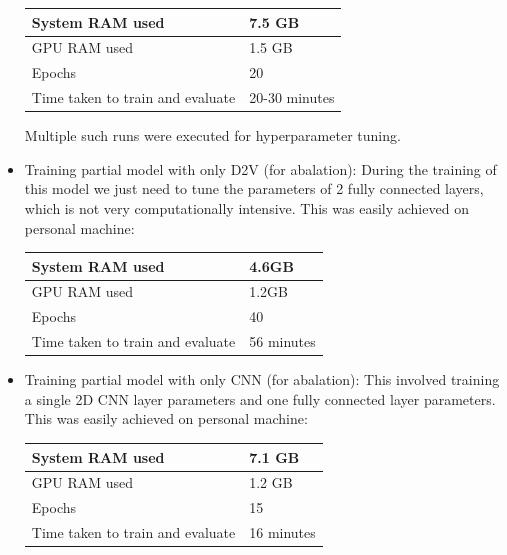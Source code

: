 \documentclass[11pt,a4paper]{article}
\begin{document}
\begin{itemize}
\begin{small}
\begin{tabular}{ ll }
	\hline
   		System RAM used & 7.5 GB \\
  	\hline
    		GPU RAM used & 1.5 GB \\
  	\hline
  		Epochs & 20 \\
  	\hline
  		Time taken to train and evaluate & 20-30 minutes \\
  	\hline
\end{tabular}
\end{small}
\newline

Multiple such runs were executed for hyperparameter tuning.

	\item Training partial model with only D2V (for abalation): During the training of this model we just need to tune the parameters of 2 fully connected layers, which is not very computationally intensive. This was easily achieved on personal machine:
\newline

\begin{small}
\begin{tabular}{ ll }
	\hline
   		System RAM used & 4.6GB \\
  	\hline
    		GPU RAM used & 1.2GB \\
  	\hline
  		Epochs & 40 \\
  	\hline
  		Time taken to train and evaluate & 56 minutes \\
  	\hline
\end{tabular}
\end{small}
\newline

	\item Training partial model with only CNN (for abalation): This involved training a single 2D CNN layer parameters and one fully connected layer parameters. This was easily achieved on personal machine:
\newline

\begin{small}
\begin{tabular}{ ll }
	\hline
   		System RAM used & 7.1 GB \\
  	\hline
    		GPU RAM used & 1.2 GB \\
  	\hline
  		Epochs & 15 \\
  	\hline
  		Time taken to train and evaluate & 16 minutes \\
  	\hline
\end{tabular}
\end{small}
\newline	


\end{itemize}
\end{document}
